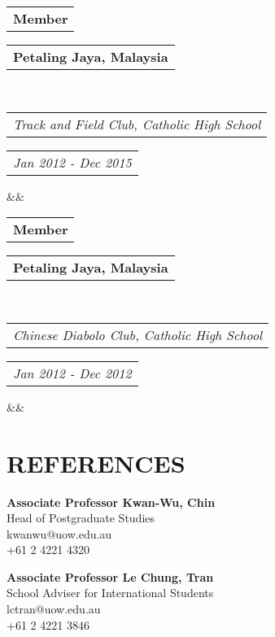 \documentclass[14pt,a4paper]{moderncv}
\makeatletter
\newcommand*{\customcventry}[7][.25em]{
  \begin{tabular}{@{}l} 
    {\bfseries #4}
  \end{tabular}
  \hfill%
  \begin{tabular}{l@{}}
     {\bfseries #5}
  \end{tabular} \\
  \begin{tabular}{@{}l} 
    {\itshape #3}
  \end{tabular}
  \hfill%
  \begin{tabular}{l@{}}
     {\itshape #2}
  \end{tabular}
  \ifx&#7&%
  \else{\\%
    \begin{minipage}{\maincolumnwidth}%
      \small#7%
    \end{minipage}}\fi%
  \par\addvspace{#1}}
\makeatother
\begin{document}
{\customcventry{Jan 2012 - Dec 2015}{Track and Field Club, Catholic High School}{Member}{Petaling Jaya, Malaysia}{}{}}

{\customcventry{Jan 2012 - Dec 2012}{Chinese Diabolo Club, Catholic High School}{Member}{Petaling Jaya, Malaysia}{}{}}
\vspace*{2mm}


\section{REFERENCES \faAsterisk}

\begin{minipage}{0.5\textwidth}
    \textbf{Associate Professor Kwan-Wu, Chin} \\
    Head of Postgraduate Studies \\
    kwanwu@uow.edu.au \\
    +61 2 4221 4320
\end{minipage}
\begin{minipage}{0.5\textwidth}
    \textbf{Associate Professor Le Chung, Tran} \\
    School Adviser for International Students \\
    lctran@uow.edu.au \\
    +61 2 4221 3846
\end{minipage}
\end{document}
